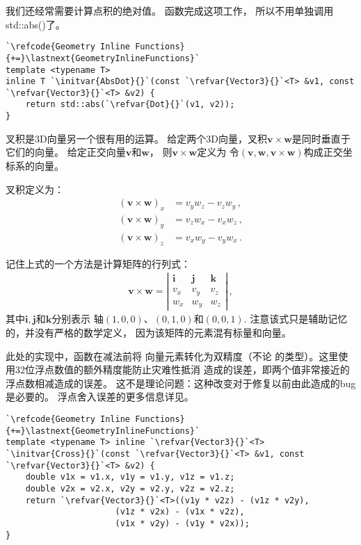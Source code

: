 我们还经常需要计算点积的绝对值。
函数完成这项工作，
所以不用单独调用{\ttfamily std::abs()}了。
\begin{lstlisting}
`\refcode{Geometry Inline Functions}{+=}\lastnext{GeometryInlineFunctions}`
template <typename T>
inline T `\initvar{AbsDot}{}`(const `\refvar{Vector3}{}`<T> &v1, const `\refvar{Vector3}{}`<T> &v2) {
    return std::abs(`\refvar{Dot}{}`(v1, v2));
}
\end{lstlisting}

叉积是3D向量另一个很有用的运算。
给定两个3D向量，叉积$\bm v\times\bm w$是同时垂直于它们的向量。
给定正交向量$\bm v$和$\bm w$，
则$\bm v\times\bm w$定义为
令$(\bm v,\bm w,\bm v\times\bm w)$构成正交坐标系的向量。

叉积定义为：
\begin{align*}
    (\bm v\times\bm w)_x & = v_y w_z- v_z w_y\, , \\
    (\bm v\times\bm w)_y & = v_z w_x- v_x w_z\, , \\
    (\bm v\times\bm w)_z & = v_x w_y- v_y w_x\, .
\end{align*}

记住上式的一个方法是计算矩阵的行列式：
\begin{align*}
    \bm v\times\bm w=\left|
    \begin{array}{ccc}
        \mathbf{i} & \mathbf{j} & \mathbf{k} \\
        v_x        & v_y        & v_z        \\
        w_x        & w_y        & w_z
    \end{array}\right|\, ,
\end{align*}
其中$\mathbf{i},\mathbf{j}$和$\mathbf{k}$分别表示
轴$(1,0,0)$、$(0,1,0)$和$(0,0,1)$.
注意该式只是辅助记忆的，并没有严格的数学定义，
因为该矩阵的元素混有标量和向量。

此处的实现中，函数在减法前将
向量元素转化为双精度（不论
的类型）。这里使用32位浮点数值的额外精度能防止灾难性抵消
造成的误差，即两个值非常接近的浮点数相减造成的误差。
这不是理论问题：这种改变对于修复以前由此造成的bug是必要的。
浮点舍入误差的更多信息详见。
\begin{lstlisting}
`\refcode{Geometry Inline Functions}{+=}\lastnext{GeometryInlineFunctions}`
template <typename T> inline `\refvar{Vector3}{}`<T>
`\initvar{Cross}{}`(const `\refvar{Vector3}{}`<T> &v1, const `\refvar{Vector3}{}`<T> &v2) {
    double v1x = v1.x, v1y = v1.y, v1z = v1.z;
    double v2x = v2.x, v2y = v2.y, v2z = v2.z;
    return `\refvar{Vector3}{}`<T>((v1y * v2z) - (v1z * v2y),
                      (v1z * v2x) - (v1x * v2z),
                      (v1x * v2y) - (v1y * v2x));
} 
\end{lstlisting}


